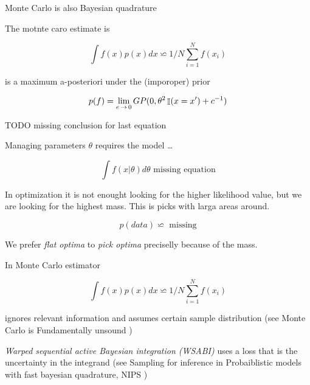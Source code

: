 \documentclass[b5paper]{report}
\begin{document}
Monte Carlo is also Bayesian quadrature

The motnte caro estimate is

\begin{equation}
  \int f(x) p(x) dx \backsimeq 1/N \sum_{i=1}^N f(x_i)
\end{equation}

is a maximum a-posteriori under the (imporoper) prior

\begin{equation}
  p(f) = \lim_{e \operatorname*{\rightarrow} 0} GP(0, \theta^2 \operatorname*{\mathbb{\mathop{I}}}(x = x') + c^{-1})
\end{equation}

TODO missing conclusion for last equation

Managing parameters $\theta$ requires the model \dots

\begin{equation}
  \int f(x|\theta) d\theta \text{  missing equation}
\end{equation}


In optimization it is not enought looking for the higher likelihood value, but
we are looking for the highest mass. This is picks with larga areas around.

\begin{equation}
  p(data) \backsimeq  \text{  missing}
\end{equation}

We prefer \emph{flat optima} to \emph{pick optima} preciselly because of the
mass.

In Monte Carlo estimator

\begin{equation}
  \int f(x) p(x) dx \backsimeq 1/N \sum_{i=1}^N f(x_i)
\end{equation}

ignores relevant information and assumes certain sample distribution (see Monte
  Carlo is Fundamentally unsound \cite{o1987monte})

\emph{Warped sequential active Bayesian integration (WSABI)} uses a loss that
is the uncertainty in the integrand (see Sampling for inference in
Probaiblistic models with fast bayesian quadrature, NIPS
\cite{gunter2014sampling})
\end{document}
